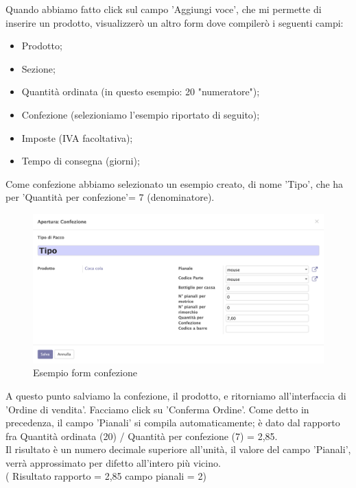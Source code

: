 Quando abbiamo fatto click sul campo 'Aggiungi voce', che mi permette di inserire un prodotto, visualizzerò un altro form dove compilerò i seguenti campi:
\begin{itemize}
\item Prodotto;
\item Sezione;
\item Quantità ordinata (in questo esempio: 20 "numeratore");
\item Confezione (selezioniamo l'esempio riportato di seguito);
\item Imposte (IVA facoltativa);
\item Tempo di consegna (giorni);
\end{itemize}

Come confezione abbiamo selezionato un esempio creato, di nome 'Tipo', che ha per 'Quantità per confezione'= 7 (denominatore).
\vspace*{1cm}
\begin{figure}[H]
	\begin{center} \includegraphics[scale=0.3]{figures/package}
		\caption[Esempio form confezione]{Esempio form confezione}
		\label{fig:package}
	\end{center}
\end{figure}

\newpage
A questo punto salviamo la confezione, il prodotto, e ritorniamo all'interfaccia di 'Ordine di vendita'.
Facciamo click su 'Conferma Ordine'. Come detto in precedenza, il campo 'Pianali' si compila automaticamente; è dato dal rapporto fra Quantità ordinata (20) / Quantità per confezione (7) = 2,85.\\
Il risultato è un numero decimale superiore all'unità, il valore del campo 'Pianali', verrà approssimato per difetto all'intero più vicino.\\
( Risultato rapporto = 2,85  campo pianali = 2)


